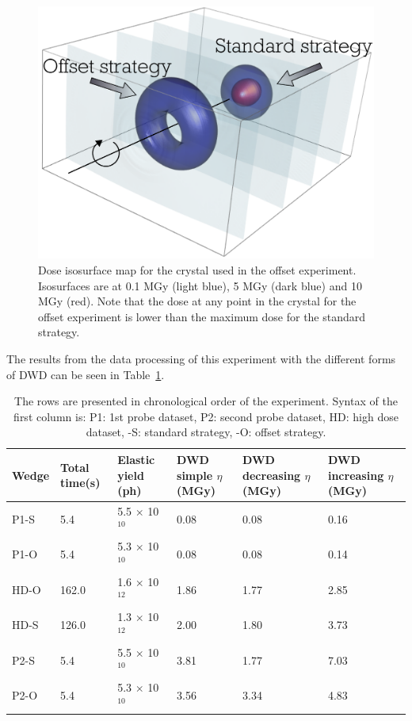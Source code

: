 \begin{figure}
  \centering
    \includegraphics[width=1\textwidth]{figures/dwd/OffsetExperimentDoseState.pdf}
    \caption{Dose isosurface map for the crystal used in the offset experiment. Isosurfaces are at 0.1 MGy (light blue), 5 MGy (dark blue) and 10 MGy (red). Note that the dose at any point in the crystal for the offset experiment is lower than the maximum dose for the standard strategy.}
    \label{fig:Offset experiment - Dose state}
\end{figure}
The results from the data processing of this experiment with the different forms of DWD can be seen in Table~\ref{tab:Offset Experiment Results}.
\begin{table}[ht!]
\small
\captionsetup{justification=centering}
	\caption{The rows are presented in chronological order of the experiment. Syntax of the first column is: P1: 1st probe dataset, P2: second probe dataset, HD: high dose dataset, -S: standard strategy, -O: offset strategy.}
	\centering
	\begin{tabular}{p{1.2cm} p{1.5cm} p{2cm} p{1.6cm} p{1.6cm} p{1.6cm}}
		Wedge   &Total time\footnotemark (s) &Elastic yield (ph)  &DWD simple $\eta$ (MGy)    & DWD decreasing $\eta$ (MGy)  &DWD increasing $\eta$ (MGy) \\
		\hline
		P1-S    & 5.4    & 5.5 $\times$ 10$^{\text{10}}$    & 0.08    & 0.08    & 0.16       \\
		P1-O    & 5.4    & 5.3 $\times$ 10$^{\text{10}}$    & 0.08    & 0.08    & 0.14       \\
		HD-O    & 162.0  & 1.6 $\times$ 10$^{\text{12}}$    & 1.86    & 1.77    & 2.85       \\
        HD-S    & 126.0  & 1.3 $\times$ 10$^{\text{12}}$    & 2.00    & 1.80    & 3.73       \\
        P2-S    & 5.4    & 5.5 $\times$ 10$^{\text{10}}$    & 3.81    & 1.77    & 7.03       \\
        P2-O    & 5.4    & 5.3 $\times$ 10$^{\text{10}}$    & 3.56    & 3.34    & 4.83       \\
		\hline
	\end{tabular}
	\label{tab:Offset Experiment Results}
\end{table}
